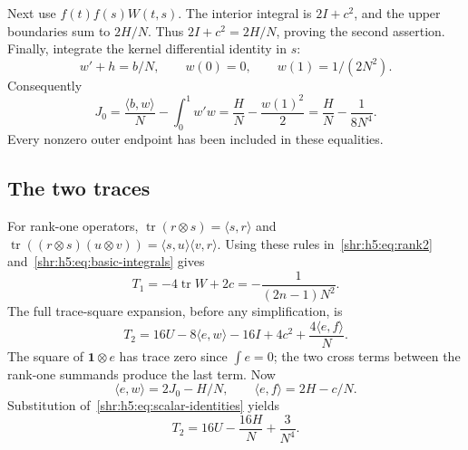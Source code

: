 \documentclass[11pt,letterpaper]{article}
\numberwithin{equation}{section}
\theoremstyle{definition}
\newcommand{\1}{\mathbf 1}
\newcommand{\one}{\mathbf1}
\newcommand{\ip}[2]{\langle #1,#2\rangle}
\DeclareMathOperator{\tr}{tr}
\begin{document}
Next use $f(t)f(s)W(t,s)$. The interior integral is $2I+c^2$,
and the upper boundaries sum to $2H/N$. Thus
$2I+c^2=2H/N$, proving the second assertion. Finally, integrate the
kernel differential identity in $s$:
\begin{equation}
 w'+h=b/N,\qquad w(0)=0,\qquad w(1)=1/(2N^2).
 \label{shr:h5:eq:w-ode}
\end{equation}
Consequently
\[
 J_0=\frac{\ip b w}{N}-\int_0^1w'w
     =\frac HN-\frac{w(1)^2}{2}
     =\frac HN-\frac1{8N^4}.
\]
Every nonzero outer endpoint has been included in these equalities.

\subsection{The two traces}
For rank-one operators, $\tr(r\otimes s)=\ip s r$ and
$\tr((r\otimes s)(u\otimes v))=\ip s u\ip v r$.
Using these rules in~\eqref{shr:h5:eq:rank2} and~\eqref{shr:h5:eq:basic-integrals}
gives
\begin{equation}
 T_1=-4\tr W+2c=-\frac1{(2n-1)N^2}.
 \label{shr:h5:eq:T1}
\end{equation}
The full trace-square expansion, before any simplification, is
\begin{equation}
 T_2=16U-8\ip e w-16I+4c^2+\frac{4\ip e f}{N}.
 \label{shr:h5:eq:T2-expand}
\end{equation}
The square of $\one\otimes e$ has trace zero since $\int e=0$;
the two cross terms between the rank-one summands produce the last term.
Now
\[
 \ip e w=2J_0-H/N,\qquad \ip e f=2H-c/N.
\]
Substitution of~\eqref{shr:h5:eq:scalar-identities} yields
\begin{equation}
 T_2=16U-\frac{16H}{N}+\frac3{N^4}.
 \label{shr:h5:eq:T2}
\end{equation}
\end{document}
